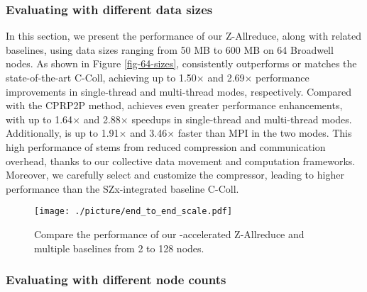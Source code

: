 
\subsubsection{Evaluating with different data sizes}\label{sec-128-sizes}

In this section, we present the performance of our Z-Allreduce, along with related baselines, using data sizes ranging from 50 MB to 600 MB on 64 Broadwell nodes. As shown in Figure \ref{fig-64-sizes}, {\pname} consistently outperforms or matches the state-of-the-art C-Coll, achieving up to 1.50$\times$ and 2.69$\times$ performance improvements in single-thread and multi-thread modes, respectively. Compared with the CPRP2P method, {\pname} achieves even greater performance enhancements, with up to 1.64$\times$ and 2.88$\times$ speedups in single-thread and multi-thread modes. Additionally, {\pname} is up to 1.91$\times$ and 3.46$\times$ faster than MPI in the two modes. This high performance of {\pname} stems from reduced compression and communication overhead, thanks to our collective data movement and computation frameworks. Moreover, we carefully select and customize the {\fzlight} compressor, leading to higher performance than the SZx-integrated baseline C-Coll.





\begin{figure}[ht]
    \centering
    {\texttt{[image: ./picture/end\_to\_end\_scale.pdf]}}
    \caption{Compare the performance of our {\pname}-accelerated Z-Allreduce and multiple baselines from 2 to 128 nodes.} 
    \label{fig-128-nodes}
\end{figure}



\subsubsection{Evaluating with different node counts}

